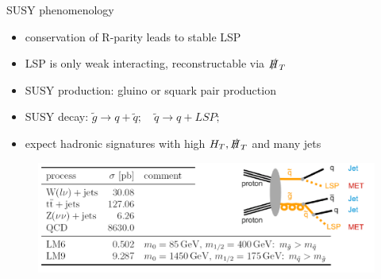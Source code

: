 

\begin{frame}{SUSY phenomenology}
	\begin{block}{  }
		\begin{itemize}
\item conservation of R-parity leads to stable LSP\\
\item LSP is only weak interacting, reconstructable via $\slashed{H}_T$ \\
\item SUSY production: \quad gluino or squark pair production\\
\item SUSY decay: \quad $\tilde{g} \rightarrow q +\tilde{q};\quad  \tilde{q} \rightarrow q + LSP;$\\ 
\item expect hadronic signatures with high $H_T, \slashed{H}_T$ and many jets
		\end{itemize}
	\end{block}

	\begin{figure}[H]
	\centering
	 \includegraphics[width=\textwidth,]{figures/feynman+bkg.png}
	\end{figure}
\end{frame}

